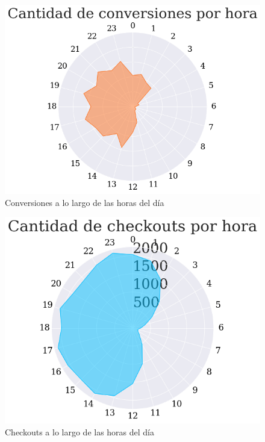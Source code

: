 \documentclass[a4paper]{article}
\begin{document}
\begin{figure}[h!]
	\includegraphics[width=\linewidth]{figures/040-hours-conversion-radarchart.png}
	\caption{Conversiones a lo largo de las horas del día}
	\label{conversionclock}
\end{figure}

\begin{figure}[h!]
	\includegraphics[width=\linewidth]{figures/041-hours-checkout-radarchart.png}
	\caption{Checkouts a lo largo de las horas del día}
	\label{checkoutclock}
\end{figure}


\newpage
\appendix


\newpage
\end{document}
